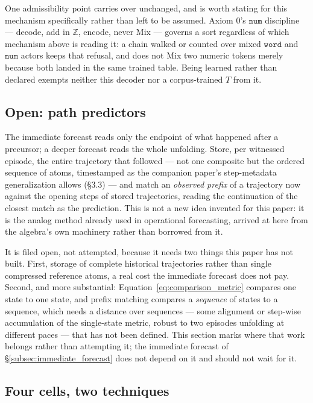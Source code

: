 \documentclass[12pt, a4paper]{article}
\begin{document}
One admissibility point carries over unchanged, and is worth stating
for this mechanism specifically rather than left to be assumed.
Axiom 0's $\mathtt{num}$ discipline --- decode, add in $\mathbb{Z}$,
encode, never Mix --- governs a sort regardless of which mechanism
above is reading it: a chain walked or counted over mixed
$\mathtt{word}$ and $\mathtt{num}$ actors keeps that refusal, and
does not Mix two numeric tokens merely because both landed in the
same trained table. Being learned rather than declared exempts
neither this decoder nor a corpus-trained $T$ from it.

\subsection{Open: path predictors}
\label{subsec:path_predictors}

The immediate forecast reads only the endpoint of what happened after
a precursor; a deeper forecast reads the whole unfolding. Store, per
witnessed episode, the entire trajectory that followed --- not one
composite but the ordered sequence of atoms, timestamped as the
companion paper's step-metadata generalization allows (\S3.3) --- and
match an
\emph{observed prefix} of a trajectory now against the opening steps of
stored trajectories, reading the continuation of the closest match as
the prediction. This is not a new idea invented for this paper: it is
the analog method already used in operational forecasting, arrived at
here from the algebra's own machinery rather than borrowed from it.

It is filed open, not attempted, because it needs two things this
paper has not built. First, storage of complete historical
trajectories rather than single compressed reference atoms, a real
cost the immediate forecast does not pay. Second, and more
substantial: Equation~\eqref{eq:comparison_metric} compares one state
to one state, and prefix matching compares a \emph{sequence} of states
to a sequence, which needs a distance over sequences --- some
alignment or step-wise accumulation of the single-state metric,
robust to two episodes unfolding at different paces --- that has not
been defined. This section marks where that work belongs rather than
attempting it; the immediate forecast of
\S\ref{subsec:immediate_forecast} does not depend on it and should not
wait for it.

\subsection{Four cells, two techniques}
\label{subsec:four_cells}
\end{document}
